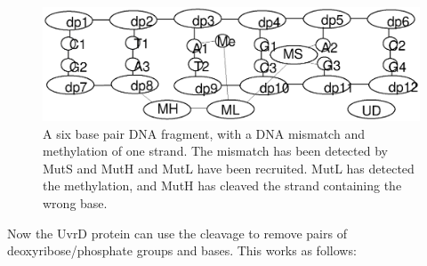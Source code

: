 \begin{figure}[h!]
  \centering
    \includegraphics[width=1.0\textwidth]{mmr/state2}
  \caption[A six base pair DNA fragment.]{A six base pair DNA fragment, with a DNA mismatch and methylation of one strand. The mismatch has been detected by MutS and MutH and MutL have been recruited. MutL has detected the methylation, and MutH has cleaved the strand containing the wrong base.}
  \label{fig:state2}
\end{figure}

Now the UvrD protein can use the cleavage to remove pairs of deoxyribose/phosphate groups and bases. This works as follows:

